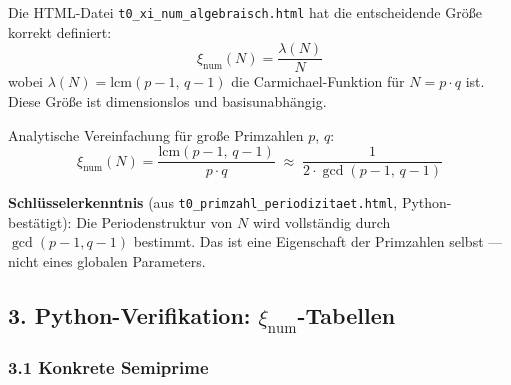 Die HTML-Datei \texttt{t0\_xi\_num\_algebraisch.html} hat die entscheidende
Größe korrekt definiert:
\[
\xi_\text{num}(N) = \frac{\lambda(N)}{N}
\]
wobei $\lambda(N) = \text{lcm}(p-1,\, q-1)$ die Carmichael-Funktion für
$N = p \cdot q$ ist. Diese Größe ist dimensionslos und basisunabhängig.

Analytische Vereinfachung für große Primzahlen $p$, $q$:
\[
\xi_\text{num}(N) = \frac{\text{lcm}(p-1,\, q-1)}{p \cdot q}
\;\approx\; \frac{1}{2 \cdot \gcd(p-1,\, q-1)}
\]

\begin{mdframed}[style=ok]
\textbf{Schlüsselerkenntnis} (aus \texttt{t0\_primzahl\_periodizitaet.html},
Python-bestätigt): Die Periodenstruktur von $N$ wird vollständig durch
$\gcd(p-1, q-1)$ bestimmt. Das ist eine Eigenschaft der Primzahlen selbst —
nicht eines globalen Parameters.
\end{mdframed}

\subsection*{3. Python-Verifikation: $\xi_\text{num}$-Tabellen}

\subsubsection*{3.1 Konkrete Semiprime}

\begin{center}
\end{center}

